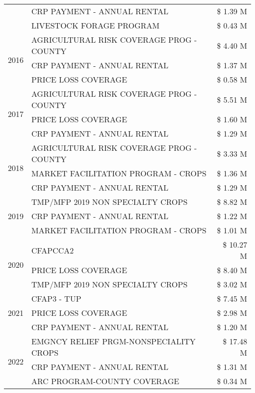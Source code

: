 \begin{tabular}{llr}
 & CRP PAYMENT - ANNUAL RENTAL & \$ 1.39 M \\
 & LIVESTOCK FORAGE PROGRAM & \$ 0.43 M \\
\cline{1-3}
\multirow[t]{3}{*}{2016} & AGRICULTURAL RISK COVERAGE PROG - COUNTY & \$ 4.40 M \\
 & CRP PAYMENT - ANNUAL RENTAL & \$ 1.37 M \\
 & PRICE LOSS COVERAGE & \$ 0.58 M \\
\cline{1-3}
\multirow[t]{3}{*}{2017} & AGRICULTURAL RISK COVERAGE PROG - COUNTY & \$ 5.51 M \\
 & PRICE LOSS COVERAGE & \$ 1.60 M \\
 & CRP PAYMENT - ANNUAL RENTAL & \$ 1.29 M \\
\cline{1-3}
\multirow[t]{3}{*}{2018} & AGRICULTURAL RISK COVERAGE PROG - COUNTY & \$ 3.33 M \\
 & MARKET FACILITATION PROGRAM - CROPS & \$ 1.36 M \\
 & CRP PAYMENT - ANNUAL RENTAL & \$ 1.29 M \\
\cline{1-3}
\multirow[t]{3}{*}{2019} & TMP/MFP 2019 NON SPECIALTY CROPS & \$ 8.82 M \\
 & CRP PAYMENT - ANNUAL RENTAL & \$ 1.22 M \\
 & MARKET FACILITATION PROGRAM - CROPS & \$ 1.01 M \\
\cline{1-3}
\multirow[t]{3}{*}{2020} & CFAPCCA2 & \$ 10.27 M \\
 & PRICE LOSS COVERAGE & \$ 8.40 M \\
 & TMP/MFP 2019 NON SPECIALTY CROPS & \$ 3.02 M \\
\cline{1-3}
\multirow[t]{3}{*}{2021} & CFAP3 - TUP & \$ 7.45 M \\
 & PRICE LOSS COVERAGE & \$ 2.98 M \\
 & CRP PAYMENT - ANNUAL RENTAL & \$ 1.20 M \\
\cline{1-3}
\multirow[t]{3}{*}{2022} & EMGNCY RELIEF PRGM-NONSPECIALITY CROPS & \$ 17.48 M \\
 & CRP PAYMENT - ANNUAL RENTAL & \$ 1.31 M \\
 & ARC PROGRAM-COUNTY COVERAGE & \$ 0.34 M \\
\cline{1-3}
\bottomrule
\end{tabular}

